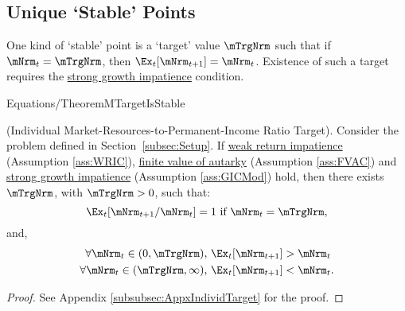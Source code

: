\documentclass[BufferStockTheory]{subfiles}
\begin{document}

\hypertarget{onetarget}{}
\hypertarget{Unique-Stable-Points}{}


\subsection{Unique `Stable' Points}\label{subsec:onetarget}\hypertarget{TheoremTarget}{}

One kind of `stable' point is a `target' value $\mTrgNrm$ such that if $\mNrm_{t}=\mTrgNrm$, then $\Ex_{t}[\mNrm_{t+1}]=\mNrm_{t}$.
Existence of such a target requires the \hyperlink{GICMod}{strong growth impatience} condition.

\begin{verbatimwrite}{Equations/TheoremMTargetIsStable}
  \begin{theorem}\label{thm:target} (Individual Market-Resources-to-Permanent-Income Ratio Target).
    Consider the problem defined in Section~\ref{subsec:Setup}.
If \hyperlink{WRIC}{weak return impatience} (Assumption \ref{ass:WRIC}), \hyperlink{FVAC}{finite value of autarky} (Assumption \ref{ass:FVAC}) and \hyperlink{GICMod}{strong growth impatience} (Assumption \ref{ass:GICMod}) hold, then there exists $\mTrgNrm$, with $\mTrgNrm>0$, such that:
    \begin{equation}
      \Ex_t [{\mNrm}_{t+1}/\mNrm_t] = 1 \mbox{~if~} \mNrm_t = \mTrgNrm, 
      \label{eq:mTarget} %
    \end{equation}
    and, 
    \begin{equation}
      \label{eq:stability} %
      \begin{split}
        \forall {\mNrm}_t\in(0,\mTrgNrm),      \,\,& \Ex_t [{\mNrm}_{t+1}] > {\mNrm}_t  \\
        \forall {\mNrm}_t\in(\mTrgNrm,\infty), \,\,& \Ex_t [{\mNrm}_{t+1}] < {\mNrm}_t.
      \end{split}
    \end{equation}
  \end{theorem}
\end{verbatimwrite}


\begin{proof}\let\qed\relax
See Appendix \ref{subsubsec:AppxIndividTarget} for the proof. 
\end{proof}
\end{document}
